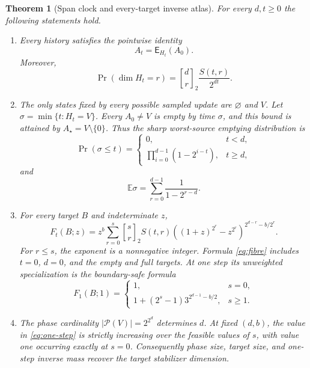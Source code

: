 \documentclass[a4paper,10pt]{amsart}
\newtheorem{theorem}{Theorem}
\newcommand{\cP}{\mathcal P}
\newcommand{\E}{\mathsf E}
\begin{document}
\begin{theorem}[Span clock and every-target inverse atlas]\label{thm:main}
For every $d,t\geq0$ the following statements hold.
\begin{enumerate}
\item Every history satisfies the pointwise identity
\begin{equation}\label{eq:span}
 A_t=\E_{H_t}(A_0).
\end{equation}
Moreover,
\begin{equation}\label{eq:rank}
 \Pr(\dim H_t=r)=
 \genfrac{[}{]}{0pt}{}{d}{r}_2\frac{S(t,r)}{2^{dt}}.
\end{equation}
\item The only states fixed by every possible sampled update are $\varnothing$
and $V$.  Let $\sigma=\min\{t:H_t=V\}$.  Every $A_0\neq V$ is empty by
time $\sigma$, and this bound is attained by $A_\star=V\setminus\{0\}$.
Thus the sharp worst-source emptying distribution is
\begin{equation}\label{eq:cdf}
 \Pr(\sigma\leq t)=
 \begin{cases}
 0,&t<d,\\[2pt]
 \displaystyle\prod_{i=0}^{d-1}(1-2^{i-t}),&t\geq d,
 \end{cases}
\end{equation}
and
\begin{equation}\label{eq:mean}
 \mathbb E\sigma=\sum_{r=0}^{d-1}\frac{1}{1-2^{r-d}}.
\end{equation}
\item For every target $B$ and indeterminate $z$,
\begin{equation}\label{eq:fibre}
 F_t(B;z)=z^b\sum_{r=0}^{s}
 \genfrac{[}{]}{0pt}{}{s}{r}_2 S(t,r)
 \left((1+z)^{2^r}-z^{2^r}\right)^{2^{d-r}-b/2^r}.
\end{equation}
For $r\leq s$, the exponent is a nonnegative integer.  Formula
\eqref{eq:fibre} includes $t=0$, $d=0$, and the empty and full targets.
At one step its unweighted specialization is the boundary-safe formula
\begin{equation}\label{eq:one-step}
 F_1(B;1)=
 \begin{cases}
 1,&s=0,\\[2pt]
 1+(2^s-1)3^{2^{d-1}-b/2},&s\geq1.
 \end{cases}
\end{equation}
\item The phase cardinality $|\cP(V)|=2^{2^d}$ determines $d$.  At fixed
$(d,b)$, the value in \eqref{eq:one-step} is strictly increasing over the
feasible values of $s$, with value one occurring exactly at $s=0$.
Consequently phase size, target size, and one-step inverse mass recover the
target stabilizer dimension.
\end{enumerate}
\end{theorem}
\end{document}
